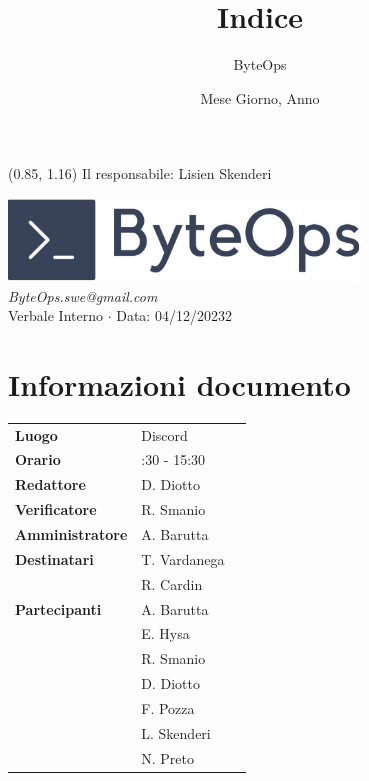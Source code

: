 \documentclass{article}
\title{\textbf{\fontsize{28}{6}\selectfont Indice}}
\author{\fontsize{14}{6}\selectfont ByteOps}
\date{Mese Giorno, Anno}
\begin{document}
\begin{textblock*}{\textwidth}(0.85\textwidth, 1.16\textheight)
    Il responsabile: Lisien Skenderi
\end{textblock*}

\pagestyle{fancy}
\begin{center}
\includegraphics[width = 0.7\textwidth]{../../../Images/logo.png} \\
\vspace{0.2cm}
\textcolor[RGB]{60, 60, 60}{\textit{ByteOps.swe@gmail.com}} \\
\vspace{1cm}
\fontsize{16}{6}\selectfont Verbale Interno $\cdot$ Data: 04/12/20232 \\
\vspace{0.5cm}
\end{center}

\section*{Informazioni documento}
\def\arraystretch{1.2}
\begin{tabular}{>{\raggedleft\arraybackslash}p{}|>{\raggedright\arraybackslash}p{}c}
\hline
\addlinespace
\textbf{Luogo} & Discord \vspace{10pt} \\
\textbf{Orario} & 14:30 - 15:30 \vspace{10pt} \\
\textbf{Redattore} & D. Diotto \vspace{10pt} \\
\textbf{Verificatore} & R. Smanio \vspace{10pt} \\
\textbf{Amministratore} & A. Barutta \vspace{10pt} \\
\textbf{Destinatari} & T. Vardanega \\ & R. Cardin \vspace{10pt} \\
\textbf{Partecipanti} & A. Barutta \\ & E. Hysa \\ & R. Smanio \\ & D. Diotto \\ & F. Pozza \\ & L. Skenderi \\ & N. Preto \vspace{10pt} \\
\end{tabular}
\pagebreak 
\end{document}
